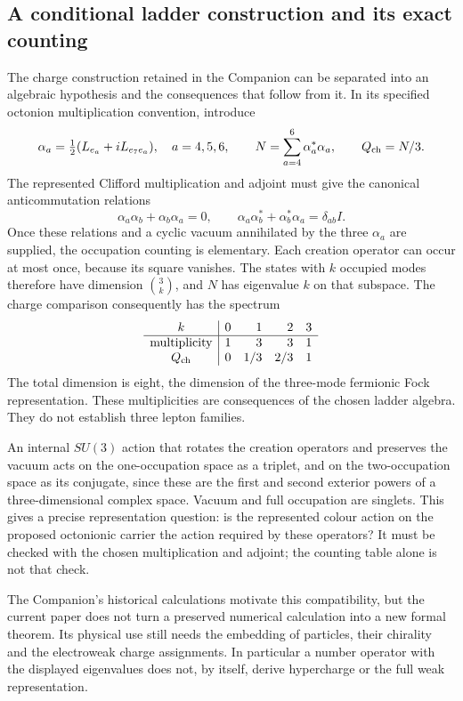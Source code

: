 \subsection{A conditional ladder construction and its exact counting}
The charge construction retained in the Companion can be separated
into an algebraic hypothesis and the consequences that follow from it.
In its specified octonion multiplication convention, introduce
\begin{equation}
 \alpha_a=\tfrac12(L_{e_a}+iL_{e_7e_a}),\quad a=4,5,6,
 \qquad N=\sum_{a=4}^6\alpha_a^*\alpha_a,
 \qquad Q_{\rm ch}=N/3.
\end{equation}
The represented Clifford multiplication and adjoint must give the
canonical anticommutation relations
\begin{equation}
 \alpha_a\alpha_b+\alpha_b\alpha_a=0,\qquad
 \alpha_a\alpha_b^*+\alpha_b^*\alpha_a=\delta_{ab}I.
\end{equation}
Once these relations and a cyclic vacuum annihilated by the three
$\alpha_a$ are supplied, the occupation counting is elementary.
Each creation operator can occur at most once, because its square
vanishes. The states with $k$ occupied modes therefore have dimension
$\binom3k$, and $N$ has eigenvalue $k$ on that subspace. The charge
comparison consequently has the spectrum
\begin{equation}
 \begin{array}{c|rrrr}
 k&0&1&2&3\\\hline
 \text{multiplicity}&1&3&3&1\\
 Q_{\rm ch}&0&1/3&2/3&1
 \end{array}
\end{equation}
The total dimension is eight, the dimension of the three-mode fermionic
Fock representation. These multiplicities are consequences of the
chosen ladder algebra. They do not establish three lepton families.

An internal $SU(3)$ action that rotates the creation operators and
preserves the vacuum acts on the one-occupation space as a triplet,
and on the two-occupation space as its conjugate, since these are
the first and second exterior powers of a three-dimensional complex
space. Vacuum and full occupation are singlets. This gives a precise
representation question: is the represented colour action on the
proposed octonionic carrier the action required by these operators?
It must be checked with the chosen multiplication and adjoint; the
counting table alone is not that check.

The Companion's historical calculations motivate this compatibility,
but the current paper does not turn a preserved numerical calculation
into a new formal theorem. Its physical use still needs the embedding
of particles, their chirality and the electroweak charge assignments.
In particular a number operator with the displayed eigenvalues does
not, by itself, derive hypercharge or the full weak representation.

